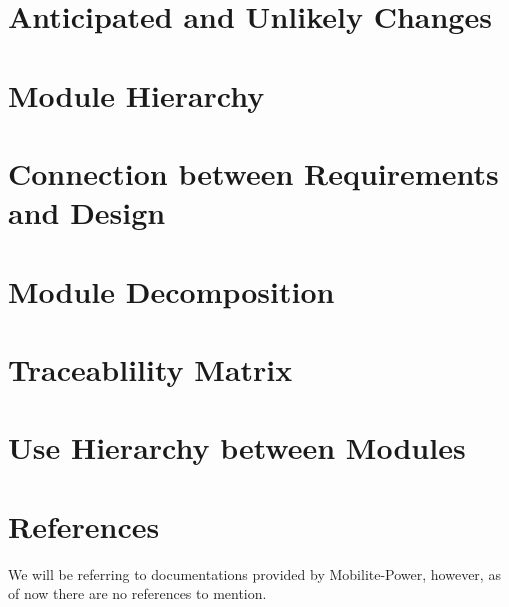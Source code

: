 \documentclass[12pt, titlepage]{article}
\begin{document}
\section{Anticipated and Unlikely Changes}

\section{Module Hierarchy}

\section{Connection between Requirements and Design}

\section{Module Decomposition}

\section{Traceablility Matrix}

\section{Use Hierarchy between Modules}

\section*{References}
We will be referring to documentations provided by Mobilite-Power, however, as of now there are no references to mention.





\newpage

\newpage{}
\end{document}
